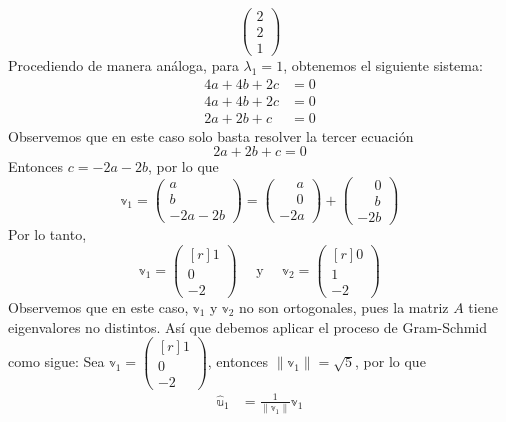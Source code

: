 \begin{example}
$$\begin{pmatrix}
        2 \\
        2 \\
        1
    \end{pmatrix}$$
    Procediendo de manera análoga, para $\lambda_1 = 1$, obtenemos el siguiente sistema:
    \begin{align*}
        4a + 4b + 2c & = 0 \\
        4a + 4b + 2c & = 0 \\
        2a + 2b + c & = 0
    \end{align*}
    Observemos que en este caso solo basta resolver la tercer ecuación
    $$2a + 2b + c = 0$$
    Entonces $c = -2a - 2b$, por lo que
    $$\mathbb{v}_1 = \begin{pmatrix}
        a \\
        b \\
        -2a -2b
    \end{pmatrix} = \begin{pmatrix}
        \phantom{-} a \\
        \phantom{-} 0 \\
        -2a
    \end{pmatrix} + \begin{pmatrix}
        \phantom{-} 0 \\
        \phantom{-} b \\
        -2b
    \end{pmatrix}$$
    Por lo tanto,
    $$\mathbb{v}_1 = \begin{pmatrix*}[r]
        1 \\
        0 \\
        -2
    \end{pmatrix*} \quad \text{ y } \quad \mathbb{v}_2 = \begin{pmatrix*}[r]
        0 \\
        1 \\
        -2
    \end{pmatrix*}$$
    Observemos que en este caso, $\mathbb{v}_1$ y $\mathbb{v}_2$ no son ortogonales, pues la matriz $A$ tiene eigenvalores no distintos. Así que debemos aplicar el proceso de Gram-Schmid como sigue: Sea $\mathbb{v}_1 = \begin{pmatrix*}[r]
        1 \\
        0 \\
        -2
    \end{pmatrix*}$, entonces $\| \mathbb{v}_1 \| = \sqrt{5}$, por lo que
    \begin{align*}
        \hat{\mathbb{u}}_1 & = \frac{1}{\| \mathbb{v}_1 \|} \mathbb{v}_1 \\

\end{align*}
\end{example}
